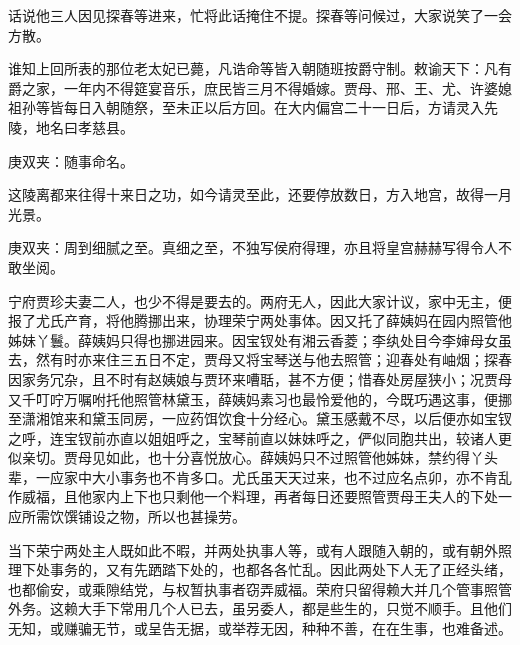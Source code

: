 

\begin{parag}
    话说他三人因见探春等进来，忙将此话掩住不提。探春等问候过，大家说笑了一会方散。
\end{parag}


\begin{parag}
    谁知上回所表的那位老太妃已薨，凡诰命等皆入朝随班按爵守制。敕谕天下：凡有爵之家，一年内不得筵宴音乐，庶民皆三月不得婚嫁。贾母、邢、王、尤、许婆媳祖孙等皆每日入朝随祭，至未正以后方回。在大内偏宫二十一日后，方请灵入先陵，地名曰孝慈县。\begin{note}庚双夹：随事命名。\end{note}这陵离都来往得十来日之功，如今请灵至此，还要停放数日，方入地宫，故得一月光景。\begin{note}庚双夹：周到细腻之至。真细之至，不独写侯府得理，亦且将皇宫赫赫写得令人不敢坐阅。\end{note}宁府贾珍夫妻二人，也少不得是要去的。两府无人，因此大家计议，家中无主，便报了尤氏产育，将他腾挪出来，协理荣宁两处事体。因又托了薛姨妈在园内照管他姊妹丫鬟。薛姨妈只得也挪进园来。因宝钗处有湘云香菱；李纨处目今李婶母女虽去，然有时亦来住三五日不定，贾母又将宝琴送与他去照管；迎春处有岫烟；探春因家务冗杂，且不时有赵姨娘与贾环来嘈聒，甚不方便；惜春处房屋狭小；况贾母又千叮咛万嘱咐托他照管林黛玉，薛姨妈素习也最怜爱他的，今既巧遇这事，便挪至潇湘馆来和黛玉同房，一应药饵饮食十分经心。黛玉感戴不尽，以后便亦如宝钗之呼，连宝钗前亦直以姐姐呼之，宝琴前直以妹妹呼之，俨似同胞共出，较诸人更似亲切。贾母见如此，也十分喜悦放心。薛姨妈只不过照管他姊妹，禁约得丫头辈，一应家中大小事务也不肯多口。尤氏虽天天过来，也不过应名点卯，亦不肯乱作威福，且他家内上下也只剩他一个料理，再者每日还要照管贾母王夫人的下处一应所需饮馔铺设之物，所以也甚操劳。
\end{parag}


\begin{parag}
    当下荣宁两处主人既如此不暇，并两处执事人等，或有人跟随入朝的，或有朝外照理下处事务的，又有先跴踏下处的，也都各各忙乱。因此两处下人无了正经头绪，也都偷安，或乘隙结党，与权暂执事者窃弄威福。荣府只留得赖大并几个管事照管外务。这赖大手下常用几个人已去，虽另委人，都是些生的，只觉不顺手。且他们无知，或赚骗无节，或呈告无据，或举荐无因，种种不善，在在生事，也难备述。
\end{parag}


